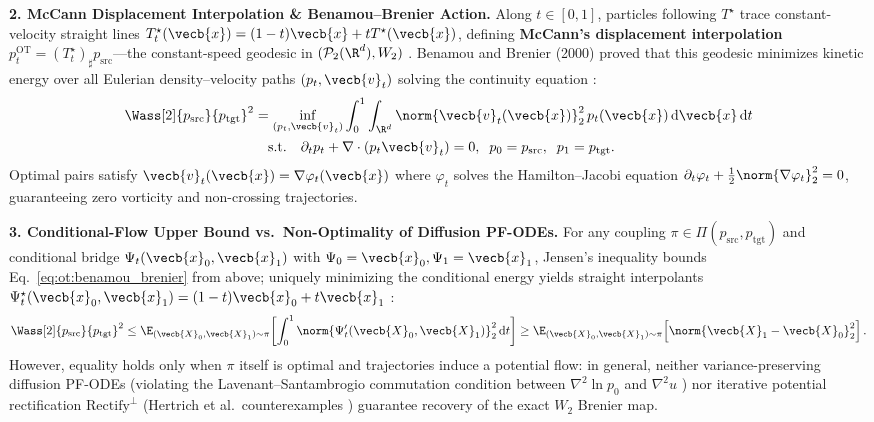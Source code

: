 \documentclass[../../../../master.tex]{subfiles}
\begin{document}
\begin{coremath}
\textbf{2. McCann Displacement Interpolation \& Benamou--Brenier Action.} Along $t \in [0, 1]$, particles following $T^\star$ trace constant-velocity straight lines $T_t^\star(\vecb{x}) = (1 - t)\vecb{x} + t T^\star(\vecb{x})$, defining \textbf{McCann's displacement interpolation} $p_t^{\mathrm{OT}} = (T_t^\star)_\sharp p_{\mathrm{src}}$---the constant-speed geodesic in $(\mathcal{P}_2(\R^d), W_2)$ . Benamou and Brenier (2000) proved that this geodesic minimizes kinetic energy over all Eulerian density--velocity paths $(p_t, \vecb{v}_t)$ solving the continuity equation :
\begin{equation}
\label{eq:ot:benamou_brenier}
\begin{aligned}
  \Wass[2]{p_{\mathrm{src}}}{p_{\mathrm{tgt}}}^2
  &= \inf_{(p_t, \vecb{v}_t)} \int_0^1 \int_{\R^d} \norm{\vecb{v}_t(\vecb{x})}_2^2\, p_t(\vecb{x})\,\mathrm{d}\vecb{x}\,\mathrm{d}t \\
  &\quad \text{s.t.} \quad \partial_t p_t + \nabla \cdot (p_t \vecb{v}_t) = 0,\;\; p_0 = p_{\mathrm{src}},\;\; p_1 = p_{\mathrm{tgt}}.
\end{aligned}
\end{equation}
Optimal pairs satisfy $\vecb{v}_t(\vecb{x}) = \nabla \varphi_t(\vecb{x})$ where $\varphi_t$ solves the Hamilton--Jacobi equation $\partial_t \varphi_t + \frac{1}{2}\norm{\nabla\varphi_t}_2^2 = 0$, guaranteeing zero vorticity and non-crossing trajectories.

\textbf{3. Conditional-Flow Upper Bound vs.\ Non-Optimality of Diffusion PF-ODEs.} For any coupling $\pi \in \Pi(p_{\mathrm{src}}, p_{\mathrm{tgt}})$ and conditional bridge $\Psi_t(\vecb{x}_0, \vecb{x}_1)$ with $\Psi_0 = \vecb{x}_0, \Psi_1 = \vecb{x}_1$, Jensen's inequality bounds Eq.~\eqref{eq:ot:benamou_brenier} from above; uniquely minimizing the conditional energy yields straight interpolants $\Psi_t^\star(\vecb{x}_0, \vecb{x}_1) = (1-t)\vecb{x}_0 + t\vecb{x}_1$ :
\begin{equation}
\label{eq:ot:flow_upper_bound}
  \Wass[2]{p_{\mathrm{src}}}{p_{\mathrm{tgt}}}^2
  \le \E_{(\vecb{X}_0, \vecb{X}_1)\sim \pi}\!\left[\int_0^1 \norm{\Psi'_t(\vecb{X}_0, \vecb{X}_1)}_2^2\,\mathrm{d}t\right]
  \ge \E_{(\vecb{X}_0, \vecb{X}_1)\sim \pi}\!\left[\norm{\vecb{X}_1 - \vecb{X}_0}_2^2\right].
\end{equation}
However, equality holds only when $\pi$ itself is optimal and trajectories induce a potential flow: in general, neither variance-preserving diffusion PF-ODEs (violating the Lavenant--Santambrogio commutation condition between $\nabla^2\ln p_0$ and $\nabla^2 u$ ) nor iterative potential rectification $\mathrm{Rectify}^\perp$ (Hertrich et al.\ counterexamples ) guarantee recovery of the exact $W_2$ Brenier map.
\end{coremath}
\end{document}
